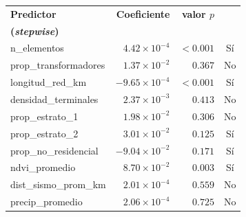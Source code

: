 \begin{tabular}{l r r c}
\toprule
\textbf{Predictor} & \textbf{Coeficiente} & \textbf{valor $p$} & \makecell[c]{\textbf{Retenido}\\\textbf{(\emph{stepwise})}} \\
\midrule
n\_elementos & $4{.}42\times10^{-4}$ & $<0{.}001$ & Sí \\
prop\_transformadores & $1{.}37\times10^{-2}$ & $0{.}367$ & No \\
longitud\_red\_km & $-9{.}65\times10^{-4}$ & $<0{.}001$ & Sí \\
densidad\_terminales & $2{.}37\times10^{-3}$ & $0{.}413$ & No \\
prop\_estrato\_1 & $1{.}98\times10^{-2}$ & $0{.}306$ & No \\
prop\_estrato\_2 & $3{.}01\times10^{-2}$ & $0{.}125$ & Sí \\
prop\_no\_residencial & $-9{.}04\times10^{-2}$ & $0{.}171$ & Sí \\
ndvi\_promedio & $8{.}70\times10^{-2}$ & $0{.}003$ & Sí \\
dist\_sismo\_prom\_km & $2{.}01\times10^{-4}$ & $0{.}559$ & No \\
precip\_promedio & $2{.}06\times10^{-4}$ & $0{.}725$ & No \\
\bottomrule
\end{tabular}
